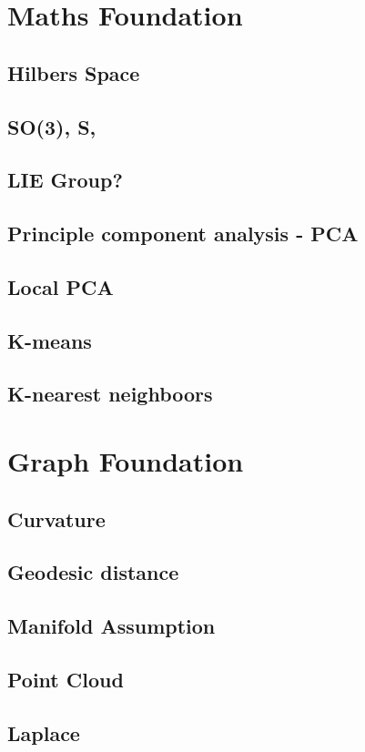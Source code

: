 \section{Maths Foundation}
\subsection{Hilbers Space}
\subsection{SO(3), S,}
\subsection{LIE Group?}
\subsection{Principle component analysis - PCA}
\subsection{Local PCA}
\subsection{K-means}
\subsection{K-nearest neighboors}


\section{Graph Foundation}
\subsection{Curvature}
\subsection{Geodesic distance}
\subsection{Manifold Assumption}
\subsection{Point Cloud}
\subsection{Laplace}
